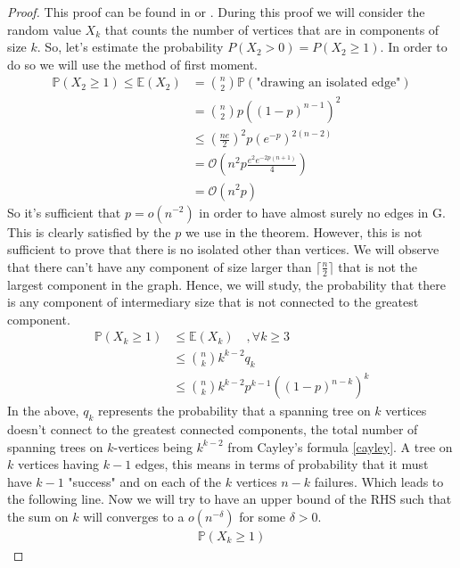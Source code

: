 \begin{proof}
This proof can be found in \cite{Spencer14} or \cite{Bollob01}.
\newline
During this proof we will consider the random value $X_k$ that counts the number of vertices that are in components of size $k$.
So, let's estimate the probability $P(X_2 > 0) = P(X_2 \geq 1 )$. In order to do so we will use the method of first moment.
\begin{align}
	\mathbb{P}(X_2 \geq 1) \leq \mathbb{E}(X_2) 	&= \binom{n}{2}\mathbb{P}(\text{"drawing an isolated edge"}) \\
						    	&= \binom{n}{2}p((1-p)^{n-1})^2 \\
							&\leq (\frac{ne}{2})^2p(e^{-p})^{2(n-2)} \\
						    	&= \mathcal{O}\left(n^2p \frac{ e^2 e^{-2p(n+1)} }{4}\right) \\
							&= \mathcal{O}(n^2p)
\end{align}
So it's sufficient that $p = o(n^{-2})$ in order to have almost surely no edges in G. This is clearly satisfied by the $p$ we use in the theorem.
\newline
However, this is not sufficient to prove that there is no isolated other than vertices. We will observe that there can't have any component of size larger than $\lceil \frac{n}{2} \rceil$ that is not the largest component in the graph.
Hence, we will study, the probability that there is any component of intermediary size that is not connected to the greatest component.
\begin{align}
	\mathbb{P}(X_k \geq 1) &\leq \mathbb{E}(X_k)\quad, \forall k \geq 3 \\
				&\leq \binom{n}{k} k^{k-2} q_k\\
				&\leq \binom{n}{k} k^{k-2} p^{k-1} ((1-p)^{n-k})^k
\end{align}
In the above, $q_k$ represents the probability that a spanning tree on $k$ vertices doesn't connect to the greatest connected components, the total number of spanning trees on $k$-vertices being $k^{k-2}$ from Cayley's formula \ref{cayley}.
A tree on $k$ vertices having $k-1$ edges, this means in terms of probability that it must have $k-1$ "success" and on each of the $k$ vertices $n-k$ failures. Which leads to the following line.
\newline 
Now we will try to have an upper bound of the RHS such that the sum on $k$ will converges to a $o(n^{-\delta})$ for some $\delta >0$.
\begin{align}
	\mathbb{P}(X_k \geq 1) 	

\end{align}
\end{proof}
